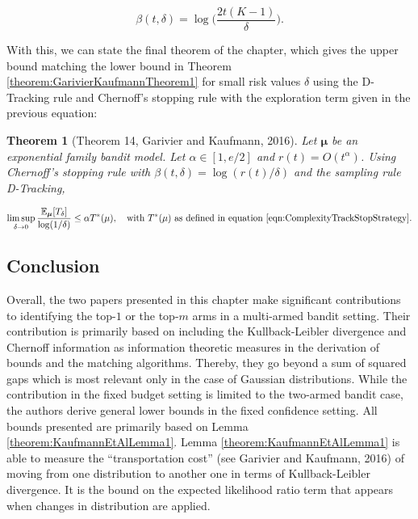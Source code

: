 \documentclass[11pt,]{article}
\newtheorem{theorem}{Theorem}
\begin{document}
\begin{equation*}
\beta(t, \delta) = \log \Big(\frac{2t(K-1)}{\delta}\Big).
\end{equation*}

With this, we can state the final theorem of the chapter, which gives
the upper bound matching the lower bound in Theorem
\ref{theorem:GarivierKaufmannTheorem1} for small risk values \(\delta\)
using the D-Tracking rule and Chernoff's stopping rule with the
exploration term given in the previous equation:

\begin{theorem}[Theorem 14, Garivier and Kaufmann, 2016] \label{theorem:GarivierAndKaufmannTheorem14}
Let $\bm{\mu}$ be an exponential family bandit model. Let $\alpha \in [1, e/2]$ and $r(t) = O(t^{\alpha})$. Using Chernoff's stopping rule with $\beta(t,\delta) = \log(r(t)/\delta)$ and the sampling rule D-Tracking,

\begin{equation*}
\limsup_{\delta \to 0} \frac{\mathbb{E}_{\bm{\mu}}[T_{\delta}]}{\log(1/\delta)} \leq \alpha T^*(\mu), \quad \text{with } T^*(\mu) \text{ as defined in equation \ref{eqn:ComplexityTrackStopStrategy}}.
\end{equation*}
\end{theorem}

\subsection{Conclusion}\label{conclusion}

Overall, the two papers presented in this chapter make significant
contributions to identifying the top-\(1\) or the top-\(m\) arms in a
multi-armed bandit setting. Their contribution is primarily based on
including the Kullback-Leibler divergence and Chernoff information as
information theoretic measures in the derivation of bounds and the
matching algorithms. Thereby, they go beyond a sum of squared gaps which
is most relevant only in the case of Gaussian distributions. While the
contribution in the fixed budget setting is limited to the two-armed
bandit case, the authors derive general lower bounds in the fixed
confidence setting. All bounds presented are primarily based on Lemma
\ref{theorem:KaufmannEtAlLemma1}. Lemma \ref{theorem:KaufmannEtAlLemma1}
is able to measure the ``transportation cost'' (see Garivier and
Kaufmann, 2016) of moving from one distribution to another one in terms
of Kullback-Leibler divergence. It is the bound on the expected
likelihood ratio term that appears when changes in distribution are
applied.
\end{document}
